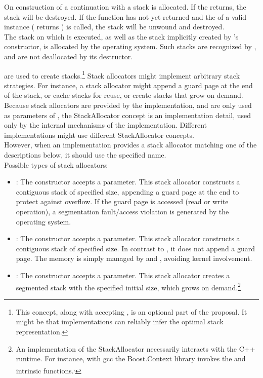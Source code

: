 \label{subsec:destruction}
On construction of a continuation with \callcc a stack is allocated. If the
\entryfn returns, the stack will be destroyed. If the function has not
yet returned and the  of a valid \cont instance (\opbool
returns ) is called, the stack will be unwound and destroyed.\\
The stack on which  is executed, as well as the stack implicitly
created by 's constructor, is allocated by the operating
system. Such stacks are recognized by \cont, and are not deallocated by its
destructor.


\label{subsec:stackalloc}
are used to create stacks.\footnote{This concept, along with \callcc accepting
, is an optional part of the proposal. It might be
that implementations can reliably infer the optimal stack representation.}
Stack allocators might implement arbitrary stack strategies. For instance, a
stack allocator might append a guard page at the end of the stack, or cache
stacks for reuse, or create stacks that grow on demand.\\
Because stack allocators are provided by the implementation, and are only used
as parameters of \callcc, the StackAllocator concept is an implementation detail,
used only by the internal mechanisms of the \cc implementation. Different
implementations might use different StackAllocator concepts.\\
However, when an implementation provides a stack allocator matching one of
the descriptions below, it should use the specified name.\\
Possible types of stack allocators:
\begin{itemize}
    \item {}: The constructor accepts a 
        parameter. This stack allocator constructs a contiguous stack of
        specified size, appending a guard page at the end to protect against
        overflow. If the guard page is accessed (read or write operation), a
        segmentation fault/access violation is generated by the operating
        system.
    \item {}: The constructor accepts a  parameter.
        This stack allocator constructs a contiguous stack of specified size.
        In contrast to , it does not append a guard
        page. The memory is simply managed by 
        and , avoiding kernel involvement.
    \item {}: The constructor accepts a  parameter.
        This stack allocator creates a segmented stack with the specified
        initial size, which grows on demand.\footnote{An implementation of
        the  StackAllocator necessarily interacts with the C++
        runtime. For instance, with gcc the Boost.Context\cite{bcontext} library
        invokes the 
        and  intrinsic
        functions.\cite{splitalloc}\textsuperscript{,}\cite{bctxseg}}
\end{itemize}
